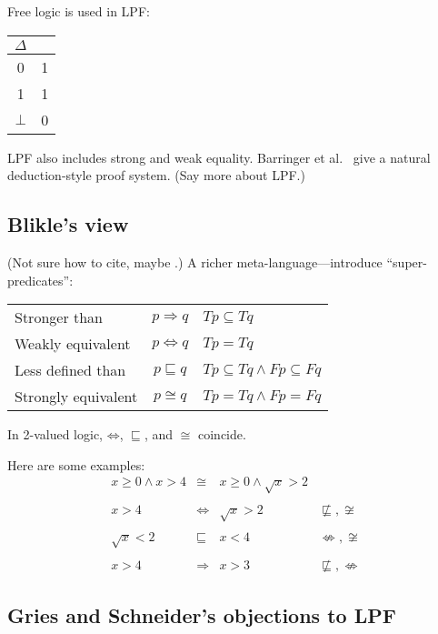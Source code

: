 \documentclass{llncs}
\newcommand{\impl}{\mathbin{\Rightarrow}}
\newcommand{\biim}{\mathbin{\Leftrightarrow}}
\begin{document}
Free logic is used in LPF:

\begin{center}
\begin{tabular}{|c|c|}
\hline
   $\Delta$ &
\\ \hline
   0      & 1
\\ 1      & 1
\\ $\bot$ & 0
\\ \hline
\end{tabular}
\end{center}
%
LPF also includes strong and weak equality.
Barringer et al.~\cite{Barringer:ActaInf84}
give a natural deduction-style proof system.
(Say more about LPF.)


\subsection{Blikle's view}

(Not sure how to cite, maybe \cite{Blikle:VDM88,Konikowska:VDM88}.)
A richer meta-language---introduce ``super-predicates'':

\begin{center}
\begin{tabular}{lcl}
   Stronger than 
	& $p \impl q$
	& $Tp \subseteq Tq$
\\ Weakly equivalent
	& $p \biim q$
	& $Tp = Tq$
\\ Less defined than
	& $p \sqsubseteq q$
	& $Tp \subseteq Tq \land Fp \subseteq Fq$
\\ Strongly equivalent
	& $p \cong q$
	& $Tp = Tq \land Fp = Fq$
\end{tabular}
\end{center}
%
In 2-valued logic, $\biim$, $\sqsubseteq$, and $\cong$ coincide.

Here are some examples:
\[
\begin{array}{rcll}
   x \geq 0 \land x > 4
        & \cong
        & x \geq 0 \land \sqrt{x} > 2
	& 
\\
\\ x > 4
        & \biim
        & \sqrt{x} > 2
	& \not\sqsubseteq, \not\cong
\\
\\ \sqrt{x} < 2
        & \sqsubseteq
        & x < 4
	& \not\Leftrightarrow, \not\cong
\\
\\ x > 4
        & \impl
        & x > 3
	& \not\sqsubseteq, \not\Leftrightarrow
\end{array}
\]


\subsection{Gries and Schneider's objections to LPF}
\end{document}
